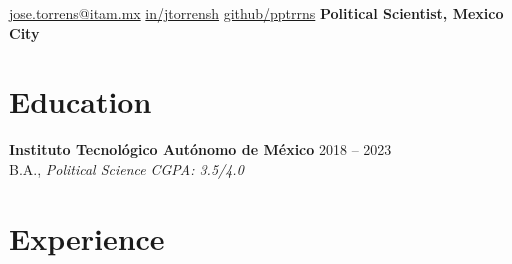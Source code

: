 \documentclass[letter]{resume}
\begin{document}

\begin{center}
\normalsize
{}
{\href{mailto://jose.torrens@itam.mx}{jose.torrens@itam.mx}}
{\href{https://www.linkedin.com/in/jtorrensh/}{in/jtorrensh}}
{\href{https://github.com/pptrrns}{github/pptrrns}}
\bfseries{Political Scientist, Mexico City}

\end{center}



\section{Education}

\begin{content}

{\bf Instituto Tecnológico Autónomo de México} \hfill{2018 -- 2023}\\ 
{B.A., \emph{Political Science}} \hfill \emph{CGPA: 3.5/4.0}

\sectionlineskip
\end{content}


\section{Experience}
\end{document}
